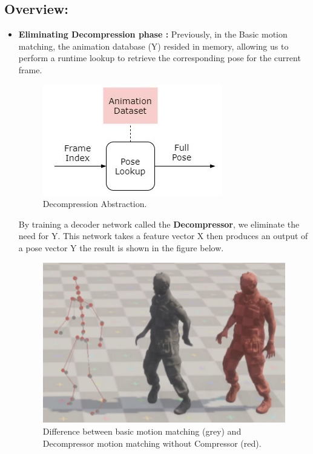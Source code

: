 \documentclass[12pt]{book}
\begin{document}
\subsection{Overview:}
\begin{itemize}
    \item \textbf{Eliminating Decompression phase :} \newline Previously, in the Basic motion matching, the animation database (Y) resided in memory, allowing us to perform a runtime lookup to retrieve the corresponding pose for the current frame. 

\begin{figure}[!h]
    \centering
    \includegraphics[scale=0.7]{Figures/Images/Decompression.jpg}
    \caption{Decompression Abstraction.}
   \end{figure}

By training a decoder network called the \textbf{Decompressor}, we eliminate the need for Y. This network takes a feature vector X then produces an output of a pose vector Y the result is shown in the figure below.


\begin{figure}[!h]
    \centering
    \includegraphics[scale=0.7]{Figures/Images/NeedLatent.jpg}
    \caption{Difference between basic motion matching (grey) and Decompressor motion matching without Compressor (red).}
   \end{figure}


\end{itemize}
\end{document}
